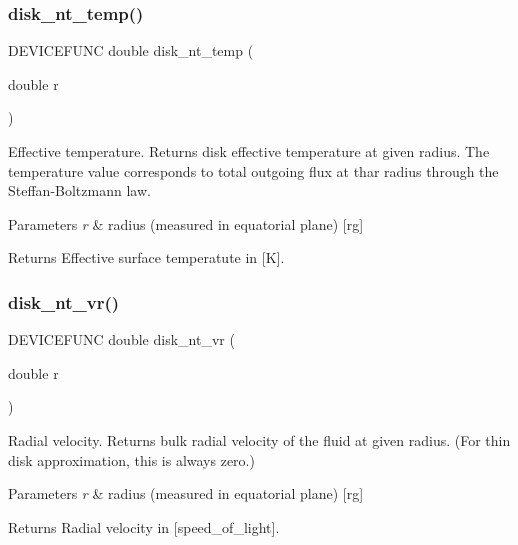 \subsubsection{\texorpdfstring{disk\+\_\+nt\+\_\+temp()}{disk\_nt\_temp()}}
{\footnotesize\ttfamily D\+E\+V\+I\+C\+E\+F\+U\+NC double disk\+\_\+nt\+\_\+temp (\begin{DoxyParamCaption}\item[{double}]{r }\end{DoxyParamCaption})}

Effective temperature. Returns disk effective temperature at given radius. The temperature value corresponds to total outgoing flux at thar radius through the Steffan-\/\+Boltzmann law.


\begin{DoxyParams}{Parameters}
{\em r} & radius (measured in equatorial plane) \mbox{[}rg\mbox{]}\\
\hline
\end{DoxyParams}
\begin{DoxyReturn}{Returns}
Effective surface temperatute in \mbox{[}K\mbox{]}. 
\end{DoxyReturn}
\mbox{\label{sim5disk-nt_8c_a9f37916b29db679c9e3484a6322eed34}} 
\subsubsection{\texorpdfstring{disk\+\_\+nt\+\_\+vr()}{disk\_nt\_vr()}}
{\footnotesize\ttfamily D\+E\+V\+I\+C\+E\+F\+U\+NC double disk\+\_\+nt\+\_\+vr (\begin{DoxyParamCaption}\item[{double}]{r }\end{DoxyParamCaption})}

Radial velocity. Returns bulk radial velocity of the fluid at given radius. (For thin disk approximation, this is always zero.)


\begin{DoxyParams}{Parameters}
{\em r} & radius (measured in equatorial plane) \mbox{[}rg\mbox{]}\\
\hline
\end{DoxyParams}
\begin{DoxyReturn}{Returns}
Radial velocity in \mbox{[}speed\+\_\+of\+\_\+light\mbox{]}. 
\end{DoxyReturn}
